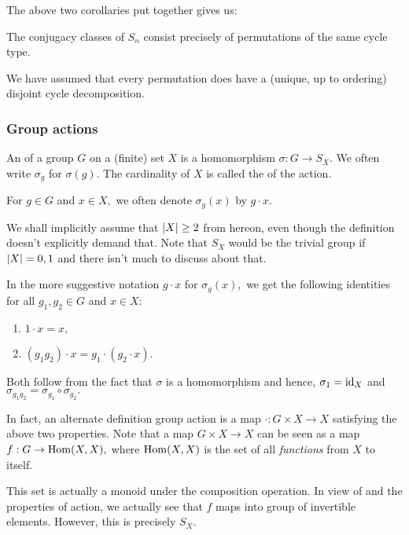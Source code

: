 The above two corollaries put together gives us:
\begin{thm} \label{thm:descconjclassSn}
	The conjugacy classes of $S_n$ consist precisely of permutations of the same cycle type.
\end{thm}

\begin{rem}
	We have assumed that every permutation does have a (unique, up to ordering) disjoint cycle decomposition.
\end{rem}

\subsubsection{Group actions} \label{subsubsec:groupactions}

\begin{defn}%
	An  of a group $G$ on a (finite) set $X$ is a homomorphism $\sigma : G \to S_X.$ We often write $\sigma_g$ for $\sigma(g).$ The cardinality of $X$ is called the  of the action.

	For $g \in G$ and $x \in X,$ we often denote $\sigma_g(x)$ by $g \cdot x.$ 
\end{defn}

\begin{rem}
	We shall implicitly assume that ${\left\lvert X \right\lvert} \ge 2$ from hereon, even though the definition doesn't explicitly demand that. Note that $S_X$ would be the trivial group if ${\left\lvert X \right\lvert} = 0, 1$ and there isn't much to discuss about that.
\end{rem}

\begin{rem}
	In the more suggestive notation $g \cdot x$ for $\sigma_g(x),$ we get the following identities for all $g_1, g_2 \in G$ and $x \in X$:
	\begin{enumerate}
		\item $1 \cdot x = x,$
		\item $(g_1g_2) \cdot x = g_1 \cdot (g_2 \cdot x).$
	\end{enumerate}
	Both follow from the fact that $\sigma$ is a homomorphism and hence, $\sigma_1 = \operatorname{id}_X$ and $\sigma_{g_1g_2} = \sigma_{g_1} \circ \sigma_{g_2}.$
\end{rem}

\begin{rem}
	In fact, an alternate definition group action is a map $\cdot : G \times X \to X$ satisfying the above two properties. Note that a map $G \times X \to X$ can be seen as a map $f : G \to \operatorname{Hom}(X, X),$ where $\operatorname{Hom}(X, X)$ is the set of all \emph{functions} from $X$ to itself.

	This set is actually a monoid under the composition operation. In view of  and the properties of action, we actually see that $f$ maps into group of invertible elements. However, this is precisely $S_X.$
\end{rem}

